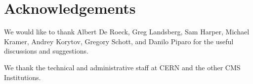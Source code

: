 
%

\section{Acknowledgements}

We would like to thank Albert De Roeck, Greg Landsberg, Sam Harper,
Michael Kramer, Andrey Korytov, Gregory Schott, and Danilo Piparo for the useful discussions and suggestions.

%

We thank the technical and administrative staff at CERN and the other CMS Institutions.


%
